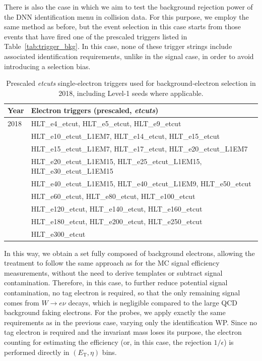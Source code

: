 There is also the case in which we aim to test the background rejection power of the DNN identification menu in collision data.  
For this purpose, we employ the same method as before, but the event selection in this case starts from those events that have fired one of the prescaled triggers listed in Table~\ref{tab:trigger_bkg}.  
In this case, none of these trigger strings include associated identification requirements, unlike in the signal case, in order to avoid introducing a selection bias.

\begin{table}[htbp]
  \centering
  \scriptsize
  \begin{tabular}{ll}
    \toprule
    \textbf{Year} & \textbf{Electron triggers (prescaled, \textit{etcuts})} \\
    \midrule
    2018 &
    HLT\_e4\_etcut, HLT\_e5\_etcut, HLT\_e9\_etcut \\
    & HLT\_e10\_etcut\_L1EM7, HLT\_e14\_etcut, HLT\_e15\_etcut \\
    & HLT\_e15\_etcut\_L1EM7, HLT\_e17\_etcut, HLT\_e20\_etcut\_L1EM7 \\
    & HLT\_e20\_etcut\_L1EM15, HLT\_e25\_etcut\_L1EM15, HLT\_e30\_etcut\_L1EM15 \\
    & HLT\_e40\_etcut\_L1EM15, HLT\_e40\_etcut\_L1EM9, HLT\_e50\_etcut \\
    & HLT\_e60\_etcut, HLT\_e80\_etcut, HLT\_e100\_etcut \\
    & HLT\_e120\_etcut, HLT\_e140\_etcut, HLT\_e160\_etcut \\
    & HLT\_e180\_etcut, HLT\_e200\_etcut, HLT\_e250\_etcut \\
    & HLT\_e300\_etcut \\
    \bottomrule
  \end{tabular}
  \caption{Prescaled \textit{etcuts} single-electron triggers used for background-electron selection in 2018, including Level-1 seeds where applicable.}
  \label{tab:electron_triggers_prescaled_2018}
\end{table}

In this way, we obtain a set fully composed of background electrons, allowing the treatment to follow the same approach as for the MC signal efficiency measurements, without the need to derive templates or subtract signal contamination.  
Therefore, in this case, to further reduce potential signal contamination, no tag electron is required, so that the only remaining signal comes from $W \to e\nu$ decays, which is negligible compared to the large QCD background faking electrons.  
For the probes, we apply exactly the same requirements as in the previous case, varying only the identification WP.  
Since no tag electron is required and the invariant mass loses its purpose, the electron counting for estimating the efficiency (or, in this case, the rejection $1/\epsilon$) is performed directly in $(E_{\text{T}},\eta)$ bins.


